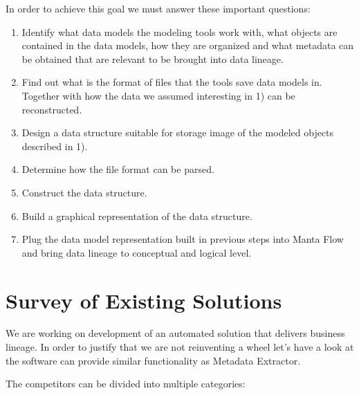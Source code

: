  In order to achieve this goal we must answer these important questions:
\begin{enumerate}
	\item Identify what data models the modeling tools work with, what objects are contained in the data models, how they are organized and what metadata can be obtained that are relevant to be brought into data lineage. 
	\item Find out what is the format of files that the tools save data models in. Together with how the data we assumed interesting in 1) can be reconstructed. 
	\item Design a data structure suitable for storage image of the modeled objects described in 1). 
	\item Determine how the file format can be parsed. 
	\item Construct the data structure. 
	\item Build a graphical representation of the data structure. 
	\item Plug the data model representation built in previous steps into Manta Flow and bring data lineage to conceptual and logical level. 
\end{enumerate}


\section{Survey of Existing Solutions}

We are working on development of an automated solution that delivers business lineage.
In order to justify that we are not reinventing a wheel let's have a look at the software can provide similar functionality as Metadata Extractor.

The competitors can be divided into multiple categories:

